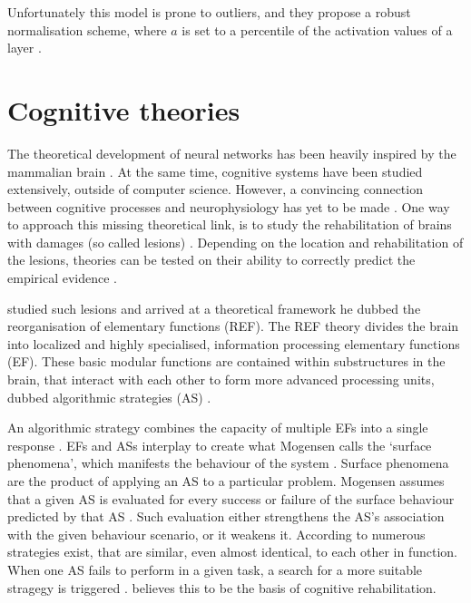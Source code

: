 \documentclass[report.tex]{subfiles}
\begin{document}
Unfortunately this model is prone to outliers, and they propose a robust normalisation scheme,
where $a$ is set to a percentile of the activation values of a layer \cite{Rueckauer2017}.

\section{Cognitive theories}
The theoretical development of neural networks has been heavily inspired
by the mammalian brain \cite{Russel2007, Nilsson2009}.
At the same time, cognitive systems have been studied extensively, outside of computer science. 
However, a convincing connection between cognitive processes and neurophysiology
has yet to be made \cite{sep:cognitive-science, Nilsson2009, Robertson1999,
sep:cognitive-science, Walter2015}. 
One way to approach this missing theoretical link, is to study 
the rehabilitation of brains with damages (so called lesions)
\cite{Robertson1999, Mogensen2011, Pedersen2018:volr-report}.
Depending on the location and rehabilitation of the lesions, theories can
be tested on their ability to correctly predict the empirical evidence
\cite{Mogensen2011, Mogensen2012b}.

\citeauthor{Mogensen2012b} studied such lesions and arrived at a theoretical
framework he dubbed the reorganisation of elementary functions (\gls{REF}). 
The \gls{REF} theory divides the brain into localized and highly specialised,
information processing elementary functions (EF).
These basic modular functions are contained within substructures in the brain, 
that interact with each other to form more advanced processing units, dubbed
algorithmic strategies (AS) \autocite{Mogensen2011}.

An algorithmic strategy combines the capacity of multiple EFs into a single
response \cite{Mogensen2011, Mogensen2012b}.
EFs and ASs interplay to create what Mogensen calls the `surface phenomena',
which manifests the behaviour of the system \cite{Mogensen2011}.
Surface phenomena are the product of applying an AS to a particular problem. Mogensen assumes that a given AS is evaluated for every success or
failure of the surface behaviour predicted by that AS \cite{Mogensen2011}.
Such evaluation either strengthens the AS's association with the given
behaviour scenario, or it weakens it.
According to \citeauthor{Mogensen2011} numerous strategies exist, that are
similar, even almost identical, to each other in function.
When one AS fails to perform in a given task, a search for a more suitable
stragegy is triggered \cite{Mogensen2012b}.
\citeauthor{Mogensen2011} believes this to be the basis of cognitive
rehabilitation.
\end{document}
